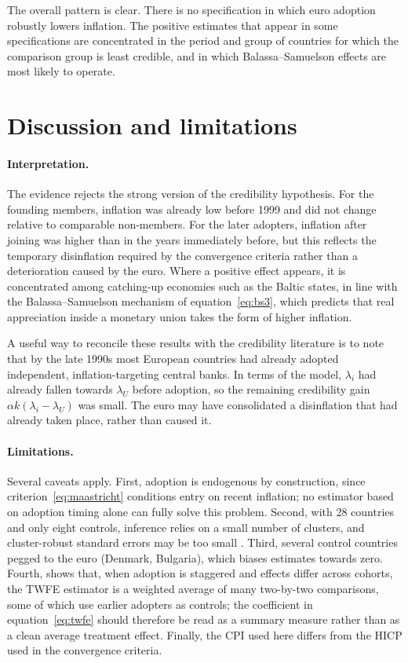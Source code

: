 \documentclass[11pt,a4paper]{article}
\numberwithin{equation}{section}
\theoremstyle{definition}
\theoremstyle{remark}
\begin{document}
The overall pattern is clear. There is no specification in which euro adoption robustly lowers inflation. The positive estimates that appear in some specifications are concentrated in the period and group of countries for which the comparison group is least credible, and in which Balassa--Samuelson effects are most likely to operate.

\section{Discussion and limitations}\label{sec:discussion}

\paragraph{Interpretation.} The evidence rejects the strong version of the credibility hypothesis. For the founding members, inflation was already low before 1999 and did not change relative to comparable non-members. For the later adopters, inflation after joining was higher than in the years immediately before, but this reflects the temporary disinflation required by the convergence criteria rather than a deterioration caused by the euro. Where a positive effect appears, it is concentrated among catching-up economies such as the Baltic states, in line with the Balassa--Samuelson mechanism of equation~\eqref{eq:bs3}, which predicts that real appreciation inside a monetary union takes the form of higher inflation.

A useful way to reconcile these results with the credibility literature is to note that by the late 1990s most European countries had already adopted independent, inflation-targeting central banks. In terms of the model, $\lambda_i$ had already fallen towards $\lambda_U$ before adoption, so the remaining credibility gain $\alpha k(\lambda_i-\lambda_U)$ was small. The euro may have consolidated a disinflation that had already taken place, rather than caused it.

\paragraph{Limitations.} Several caveats apply. First, adoption is endogenous by construction, since criterion~\eqref{eq:maastricht} conditions entry on recent inflation; no estimator based on adoption timing alone can fully solve this problem. Second, with 28 countries and only eight controls, inference relies on a small number of clusters, and cluster-robust standard errors may be too small \citep{cameron2015}. Third, several control countries pegged to the euro (Denmark, Bulgaria), which biases estimates towards zero. Fourth, \citet{goodmanbacon2021} shows that, when adoption is staggered and effects differ across cohorts, the TWFE estimator is a weighted average of many two-by-two comparisons, some of which use earlier adopters as controls; the coefficient in equation~\eqref{eq:twfe} should therefore be read as a summary measure rather than as a clean average treatment effect. Finally, the CPI used here differs from the HICP used in the convergence criteria.
\end{document}
